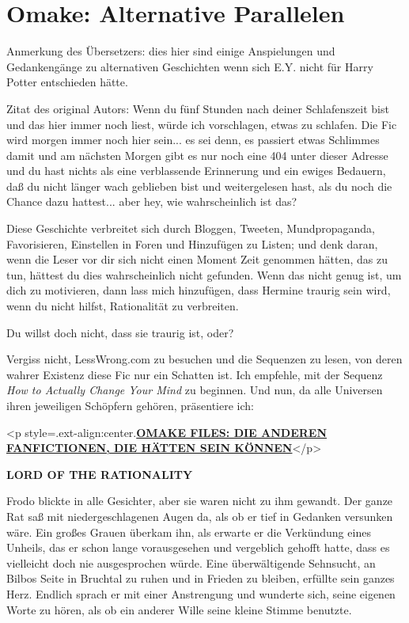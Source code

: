 \chapter{Omake: Alternative Parallelen}

Anmerkung des Übersetzers: dies hier sind einige Anspielungen und Gedankengänge
zu alternativen Geschichten wenn sich E.Y. nicht für Harry Potter entschieden
hätte.

Zitat des original Autors: Wenn du fünf Stunden nach deiner Schlafenszeit bist
und das hier immer noch liest, würde ich vorschlagen, etwas zu schlafen. Die Fic
wird morgen immer noch hier sein... es sei denn, es passiert etwas Schlimmes
damit und am nächsten Morgen gibt es nur noch eine 404 unter dieser Adresse und
du hast nichts als eine verblassende Erinnerung und ein ewiges Bedauern, daß du
nicht länger wach geblieben bist und weitergelesen hast, als du noch die Chance
dazu hattest... aber hey, wie wahrscheinlich ist das?

Diese Geschichte verbreitet sich durch Bloggen, Tweeten, Mundpropaganda,
Favorisieren, Einstellen in Foren und Hinzufügen zu Listen; und denk daran, wenn
die Leser vor dir sich nicht einen Moment Zeit genommen hätten, das zu tun,
hättest du dies wahrscheinlich nicht gefunden. Wenn das nicht genug ist, um dich
zu motivieren, dann lass mich hinzufügen, dass Hermine traurig sein wird, wenn
du nicht hilfst, Rationalität zu verbreiten.

Du willst doch nicht, dass sie traurig ist, oder?

Vergiss nicht, LessWrong.com zu besuchen und die Sequenzen zu lesen, von deren
wahrer Existenz diese Fic nur ein Schatten ist. Ich empfehle, mit der Sequenz
\emph{How to Actually Change Your Mind }zu beginnen. Und nun, da alle Universen
ihren jeweiligen Schöpfern gehören, präsentiere ich:


<p style=\grqq{}.ext-align:center\grqq{}.\textbf{\underline{OMAKE FILES: DIE
ANDEREN FANFICTIONEN, DIE HÄTTEN SEIN KÖNNEN}}</p>


\textbf{LORD OF THE RATIONALITY}

Frodo blickte in alle Gesichter, aber sie waren nicht zu ihm gewandt. Der ganze
Rat saß mit niedergeschlagenen Augen da, als ob er tief in Gedanken versunken
wäre. Ein großes Grauen überkam ihn, als erwarte er die Verkündung eines
Unheils, das er schon lange vorausgesehen und vergeblich gehofft hatte, dass es
vielleicht doch nie ausgesprochen würde. Eine überwältigende Sehnsucht, an
Bilbos Seite in Bruchtal zu ruhen und in Frieden zu bleiben, erfüllte sein
ganzes Herz. Endlich sprach er mit einer Anstrengung und wunderte sich, seine
eigenen Worte zu hören, als ob ein anderer Wille seine kleine Stimme benutzte.

